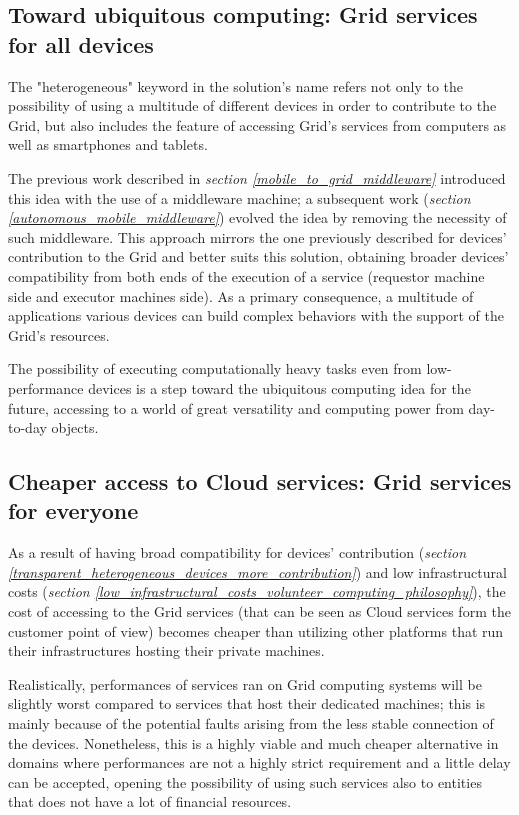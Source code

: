 \subsection{Toward ubiquitous computing: Grid services for all devices}\label{grid_services_for_all_devices}
The "heterogeneous" keyword in the solution's name refers not only to the possibility of using a multitude of different devices in order to contribute to the Grid, but also includes the feature of accessing Grid's services from computers as well as smartphones and tablets.

The previous work described in \textit{section \ref{mobile_to_grid_middleware}} introduced this idea with the use of a middleware machine; a subsequent work (\textit{section \ref{autonomous_mobile_middleware}}) evolved the idea by removing the necessity
of such middleware. This approach mirrors the one previously described for devices' contribution to the Grid and better suits this solution, obtaining broader devices' compatibility from both ends of the execution of a service (requestor machine side and executor machines side). As a primary consequence, a multitude of applications various devices can build complex behaviors with the support of the Grid's resources.

The possibility of executing computationally heavy tasks even from low-performance devices is a step toward the ubiquitous computing idea for the future, accessing to a world of great versatility and computing power from day-to-day objects.

\subsection{Cheaper access to Cloud services: Grid services for everyone}\label{cheaper_access_to_cloud_services}
As a result of having broad compatibility for devices' contribution (\textit{section \ref{transparent_heterogeneous_devices_more_contribution}}) and low infrastructural costs (\textit{section \ref{low_infrastructural_costs_volunteer_computing_philosophy}}), the cost of accessing to the Grid services (that can be seen as Cloud services form the customer point of view) becomes cheaper than utilizing other platforms that run their infrastructures hosting their private machines.

Realistically, performances of services ran on Grid computing systems will be slightly worst compared to services that host their dedicated machines; this is mainly because of the potential faults arising from the less stable connection of the devices. Nonetheless, this is a highly viable and much cheaper alternative in domains where performances are not a highly strict requirement and a little delay can be accepted, opening the possibility of using such services also to entities that does not have a lot of financial resources.

